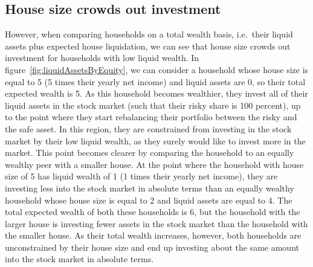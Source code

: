 
  \subsection{House size crowds out investment}

  However, when comparing households on a total wealth basis, i.e.\ their liquid assets plus expected house liquidation, we can see that house size crowds out investment for households with low liquid wealth. In figure~\ref{fig:liquidAssetsByEquity}, we can consider a household whose house size is equal to 5 (5 times their yearly net income) and liquid assets are 0, so their total expected wealth is 5. As this household becomes wealthier, they invest all of their liquid assets in the stock market (such that their risky share is 100 percent), up to the point where they start rebalancing their portfolio between the risky and the safe asset. In this region, they are constrained from investing in the stock market by their low liquid wealth, as they surely would like to invest more in the market. This point becomes clearer by comparing the household to an equally wealthy peer with a smaller house.  At the point where the household with house size of 5 has liquid wealth of 1 (1 times their yearly net income), they are investing less into the stock market in absolute terms than an equally wealthy household whose house size is equal to 2 and liquid assets are equal to 4. The total expected wealth of both these households is 6, but the household with the larger house is investing fewer assets in the stock market than the household with the smaller house. As their total wealth increases, however, both households are unconstrained by their house size and end up investing about the same amount into the stock market in absolute terms.

  \providecommand{\figName}{}
  \renewcommand{\figName}{liquidAssetsByEquity}
  \providecommand{\figFile}{}
  \renewcommand{\figFile}{\figName}

